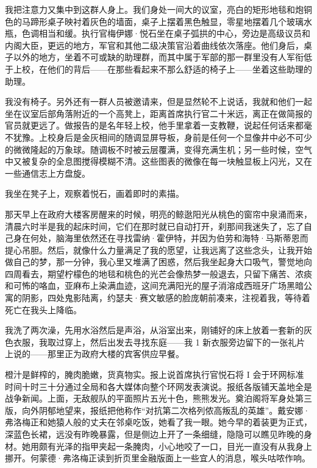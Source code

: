 \documentclass[AutoFakeBold=true]{book}
\begin{document}
我把注意力又集中到这群人身上。我们身处一间大的议室，亮白的矩形地毯和炮铜色的马蹄形桌子映衬着灰色的墙面，桌子上摆着黑色触显，零星地摆着几个玻璃水瓶，色调相当和缓。执行官梅伊娜·悦石坐在桌子弧拱的中心，旁边是高级议员和内阁大臣，更远的地方，军官和其他二级决策官沿着曲线依次落座。他们身后，桌子以外的地方，坐着不可或缺的助理群，而其中属于军部的那一群里没有人军衔低于上校，在他们的背后——在那些看起来不那么舒适的椅子上——坐着这些助理的助理。

我没有椅子。另外还有一群人员被邀请来，但是显然轮不上说话，我就和他们一起坐在议室后部角落附近的一个高凳上，距离首席执行官二十米远，离正在做简报的官员就更远了。做报告的是名年轻上校，他手里拿着一支教鞭，说起任何话来都毫不犹豫。上校身后是金灰相间的随调显屏导板，身前是任何一个显像井中必不可少的微微隆起的万象球。随调板不时被云层覆满，变得充满生机；另一些时候，空气中又被复杂的全息图搅得模糊不清。这些图表的微像在每一块触显板上闪光，又在一些通信志上方盘旋。

我坐在凳子上，观察着悦石，画着即时的素描。

\vspace*{1em}

那天早上在政府大楼客房醒来的时候，明亮的鲸逖阳光从桃色的窗帘中泉涌而来，清晨六时半是我的起床时间，它们在那时就已自动打开，刹那间我迷失了，忘了自己身在何处，脑海里依然还在寻找雷纳·霍伊特，并因为伯劳和海特·马斯蒂恩而提心吊胆。然后，就像什么力量满足了我的愿望，让我远离了这些念头，让我开始做自己的梦，那一分钟，我心里又堆满了困惑，然后我坐起身大口吸气，警觉地向四周看去，期望柠檬色的地毯和桃色的光芒会像热梦一般退去，只留下痛苦、浓痰和可怖的咯血，亚麻布上染满血迹，这间充满阳光的屋子消溶成西班牙广场黑暗公寓的阴影，四处鬼影陆离，约瑟夫·赛文敏感的脸庞朝前凑来，注视着我，等待着死亡在我头上降临。

我洗了两次澡，先用水浴然后是声浴，从浴室出来，刚铺好的床上放着一套新的灰色衣服，我取过穿上，然后出发去寻找东庭——我 1 新衣服旁边留下的一张礼片上说的——那里正为政府大楼的宾客供应早餐。

橙汁是鲜榨的，腌肉脆嫩，货真物实。报上说首席执行官悦石将 I 会于环网标准时间十时三十分通过全局和各大媒体向整个环网发表演说。报纸各版铺天盖地全是战争新闻。上面，无敌舰队的平面照片五光十色，熊熊发光。奠泊阁将军身处第三版，向外阴郁地望来，报纸把他称作``对抗第二次格列侬高叛乱的英雄''。戴安娜·弗洛梅正和她猿人般的丈夫在邻桌吃饭，她看了我一眼。她今早的着装更为正式，深蓝色长裙，远没有昨晚暴露，但是侧边上开了一条细缝，隐隐可以瞧见昨晚的身材。她用颇有光泽的指甲夹起一条腌肉，小心地咬了一口，目光一直没有从我身上挪开。何蒙德·弗洛梅正读到折页里金融版面上一些宜人的消息，喉头咕哝作响。
\end{document}
